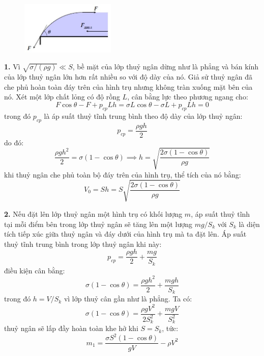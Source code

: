 \vspace{-1cm}
\begin{figure}
  \centering
  \includegraphics[width=0.4\textwidth]{Figures/Fig 2S1.jpg}
\end{figure}

\noindent\textbf{1.} Vì $\sqrt{\sigma/(\rho g)}\ll S$, bề mặt của lớp thuỷ ngân dừng như là phẳng và bán kính của lớp thuỷ ngân lớn hơn rất nhiều so với độ dày của nó. Giả sử thuỷ ngân đã che phủ hoàn toàn đáy trên của hình trụ nhưng không tràn xuống mặt bên của nó. Xét một lớp chất lỏng có độ rồng $L$, cân bằng lực theo phương ngang cho:
\begin{equation*}
  F\cos\theta-F+p_{cp}Lh=\sigma L\cos\theta-\sigma L+p_{cp}Lh=0
\end{equation*}
trong đó $p_{cp}$ là áp suất thuỷ tĩnh trung bình theo độ dày của lớp thuỷ ngân:
\begin{equation*}
  p_{cp}=\frac{\rho gh}{2}
\end{equation*}
do đó:
\begin{equation*}
  \frac{\rho gh^{2}}{2}=\sigma(1-\cos\theta)\implies h=\sqrt{\frac{2\sigma(1-\cos\theta)}{\rho g}}
\end{equation*}
khi thuỷ ngân che phủ toàn bộ đáy trên của hình trụ, thể tích của nó bằng:
\begin{equation*}
  V_{0}=Sh=S\sqrt{\frac{2\sigma(1-\cos\theta)}{\rho g}}
\end{equation*}



\noindent\textbf{2.} Nếu đặt lên lớp thuỷ ngân một hình trụ có khối lượng $m$, áp suất thuỷ tĩnh tại mỗi điểm bên trong lớp thuỷ ngân sẽ tăng lên một lượng $mg/S_{k}$ với $S_{k}$ là diện tích tiếp xúc giữa thuỷ ngân và đáy dưới của hình trụ mà ta đặt lên. Áp suất thuỷ tĩnh trung bình trong lớp thuỷ ngân khi này:
\begin{equation*}
  p_{cp}=\frac{\rho gh}{2}+\frac{mg}{S_{k}}
\end{equation*}
điều kiện cân bằng:
\begin{equation*}
  \sigma(1-\cos\theta)=\frac{\rho gh^{2}}{2}+\frac{mgh}{S_{k}}
\end{equation*}
trong đó $h=V/S_{k}$ vì lớp thuỷ cân gần như là phẳng. Ta có:
\begin{equation*}
  \sigma(1-\cos\theta)=\frac{\rho gV^{2}}{2S_{k}^{2}}+\frac{mgV}{S_{k}^{2}}
\end{equation*}
thuỷ ngân sẽ lấp đầy hoàn toàn khe hở khi $S=S_{k}$, tức:
\begin{equation*}
  m_{1}=\frac{\sigma S^{2}(1-\cos\theta)}{gV}-\rho V^{2}
\end{equation*}

